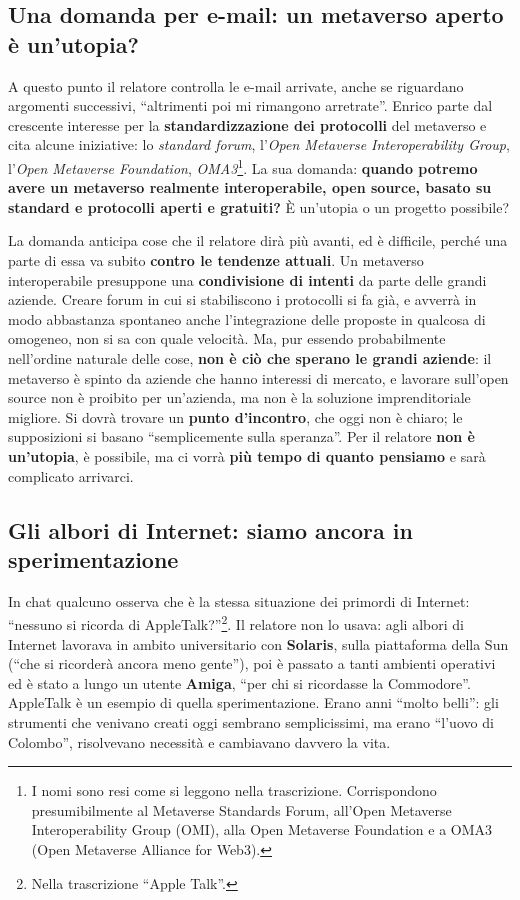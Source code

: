 \subsection{Una domanda per e-mail: un metaverso aperto è un'utopia?}

A questo punto il relatore controlla le e-mail arrivate, anche se riguardano
argomenti successivi, ``altrimenti poi mi rimangono arretrate''. Enrico parte
dal crescente interesse per la \textbf{standardizzazione dei protocolli} del
metaverso e cita alcune iniziative: lo \emph{standard forum}, l'\emph{Open
Metaverse Interoperability Group}, l'\emph{Open Metaverse Foundation},
\emph{OMA3}\footnote{I nomi sono resi come si leggono nella trascrizione.
Corrispondono presumibilmente al Metaverse Standards Forum, all'Open Metaverse
Interoperability Group (OMI), alla Open Metaverse Foundation e a OMA3 (Open
Metaverse Alliance for Web3).}. La sua domanda: \textbf{quando potremo avere un
metaverso realmente interoperabile, open source, basato su standard e protocolli
aperti e gratuiti?} È un'utopia o un progetto possibile?

La domanda anticipa cose che il relatore dirà più avanti, ed è difficile, perché
una parte di essa va subito \textbf{contro le tendenze attuali}. Un metaverso
interoperabile presuppone una \textbf{condivisione di intenti} da parte delle
grandi aziende. Creare forum in cui si stabiliscono i protocolli si fa già, e
avverrà in modo abbastanza spontaneo anche l'integrazione delle proposte in
qualcosa di omogeneo, non si sa con quale velocità. Ma, pur essendo
probabilmente nell'ordine naturale delle cose, \textbf{non è ciò che sperano le
grandi aziende}: il metaverso è spinto da aziende che hanno interessi di
mercato, e lavorare sull'open source non è proibito per un'azienda, ma non è la
soluzione imprenditoriale migliore. Si dovrà trovare un \textbf{punto
d'incontro}, che oggi non è chiaro; le supposizioni si basano ``semplicemente
sulla speranza''. Per il relatore \textbf{non è un'utopia}, è possibile, ma ci
vorrà \textbf{più tempo di quanto pensiamo} e sarà complicato arrivarci.

\subsection{Gli albori di Internet: siamo ancora in sperimentazione}

In chat qualcuno osserva che è la stessa situazione dei primordi di Internet:
``nessuno si ricorda di AppleTalk?''\footnote{Nella trascrizione ``Apple
Talk''.}. Il relatore non lo usava: agli albori di Internet lavorava in ambito
universitario con \textbf{Solaris}, sulla piattaforma della Sun (``che si
ricorderà ancora meno gente''), poi è passato a tanti ambienti operativi ed è
stato a lungo un utente \textbf{Amiga}, ``per chi si ricordasse la Commodore''.
AppleTalk è un esempio di quella sperimentazione. Erano anni ``molto belli'':
gli strumenti che venivano creati oggi sembrano semplicissimi, ma erano
``l'uovo di Colombo'', risolvevano necessità e cambiavano davvero la vita.

